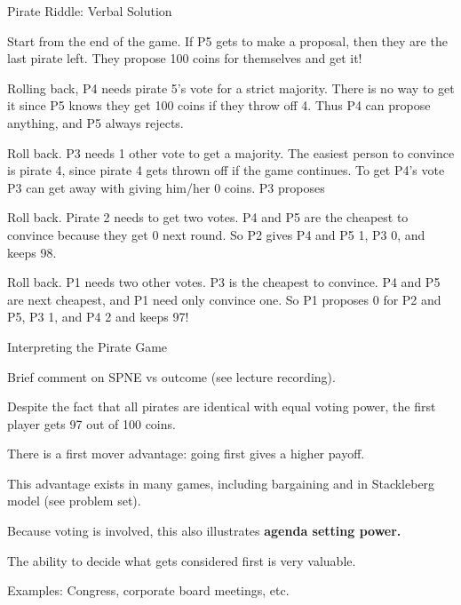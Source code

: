\documentclass[aspectratio=169]{beamer}
\newenvironment{wideitemize}{\itemize\addtolength{\itemsep}{10pt}}{\enditemize}
\begin{document}
\begin{frame}{Pirate Riddle: Verbal Solution}

\begin{wideitemize}
    \item Start from the end of the game. If P5 gets to make a proposal, then they are the last pirate left. They propose 100 coins for themselves and get it!\pause
    \item Rolling back, P4 needs pirate 5's vote for a strict majority. There is no way to get it since P5 knows they get 100 coins if they throw off 4. Thus P4 can propose anything, and P5 always rejects.\pause
    \item Roll back. P3 needs 1 other vote to get a majority. The easiest person to convince is pirate 4, since pirate 4 gets thrown off if the game continues. To get P4's vote P3 can get away with giving him/her 0 coins. P3 proposes\pause
    \item Roll back. Pirate 2 needs to get two votes. P4 and P5 are the cheapest to convince because they get 0 next round. So P2 gives P4 and P5 1, P3 0, and keeps 98.\pause
    \item Roll back. P1 needs two other votes. P3 is the cheapest to convince. P4 and P5 are next cheapest, and P1 need only convince one. So P1 proposes 0 for P2 and P5, P3 1, and P4 2 and keeps 97!\pause
\end{wideitemize}
\end{frame}

\begin{frame}{Interpreting the Pirate Game}
\begin{wideitemize}
    \item Brief comment on SPNE vs outcome (see lecture recording).
    \item Despite the fact that all pirates are identical with equal voting power, the first player gets 97 out of 100 coins.
    \item There is a first mover advantage: going first gives a higher payoff.
    \item This advantage exists in many games, including bargaining and in Stackleberg model (see problem set).
    \item Because voting is involved, this also illustrates \textbf{agenda setting power.}
    \item The ability to decide what gets considered first is very valuable.
    \item Examples: Congress, corporate board meetings, etc.
    
\end{wideitemize}

    
\end{frame}
\end{document}
